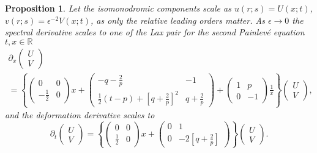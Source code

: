 \documentclass[10pt,reqno]{amsart}
\theoremstyle{plain}
\newtheorem{proposition}{Proposition}
\theoremstyle{definition}
\theoremstyle{remark}
\begin{document}
\begin{proposition}
Let the isomonodromic components scale as $ u(r;s) = U(x;t) $, $ v(r;s) = \epsilon^{-2} V(x;t) $, as only the relative
leading orders matter.
As $ \epsilon \to 0 $ the spectral derivative scales to one of the Lax pair for the second Painlev\'e equation
$ t,x \in {\mathbb R} $
\begin{multline}
 \partial_x \begin{pmatrix}
             U \\ V
            \end{pmatrix}
\\
 = \left\{ \begin{pmatrix}
            0 & 0 \\ -\frac{1}{2} & 0 
           \end{pmatrix} x
          +\begin{pmatrix}
            -q-\frac{\displaystyle 2}{\displaystyle p} & -1 \\ \frac{1}{2}(t-p)+\left[q+\frac{\displaystyle 2}{\displaystyle p}\right]^2 & q+\frac{\displaystyle 2}{\displaystyle p}
           \end{pmatrix}
           +\begin{pmatrix}
             1 & p \\ 0 & -1 
            \end{pmatrix} \frac{1}{x}
   \right\} \begin{pmatrix}
             U \\ V
            \end{pmatrix} ,
\label{H2S_spectral}
\end{multline}
and the deformation derivative scales to
\begin{equation}
  \partial_t \begin{pmatrix}
             U \\ V
             \end{pmatrix}
 = \left\{ \begin{pmatrix}
            0 & 0 \\ \frac{1}{2} & 0 
           \end{pmatrix} x
          +\begin{pmatrix}
            0 & 1 \\ 0 & -2\left[ q+\frac{\displaystyle 2}{\displaystyle p} \right]
           \end{pmatrix}
   \right\} \begin{pmatrix}
             U \\ V
            \end{pmatrix} .
\label{H2S_deform}
\end{equation}   
\end{proposition}
\end{document}
